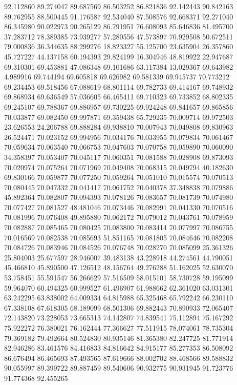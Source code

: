 92.112860
89.274047
89.687569
86.503252
86.821836
92.142443
90.842163
89.762955
88.500445
91.176587
92.534040
87.508576
92.668371
92.271040
86.345980
90.022973
90.265129
86.791951
76.608093
85.646836
81.495700
37.283712
78.389385
73.939277
57.280556
47.573897
70.929508
50.672511
79.000836
36.344635
88.299276
18.823327
55.125700
23.635904
26.357860
45.727227
44.137158
60.194393
29.824199
16.304946
48.819922
22.947687
69.310301
69.453881
47.086348
69.101686
63.117384
13.029367
69.643982
4.989916
69.744194
69.605818
69.626982
69.581339
69.945737
70.773212
69.234453
69.518456
67.088619
68.801114
69.782733
69.414167
69.748932
69.868934
69.636549
57.036605
66.465411
69.710323
69.733852
68.802335
69.245107
69.788367
69.886957
69.730225
69.924248
69.841657
69.865856
70.033877
69.082450
69.997871
69.359438
65.729235
70.009714
69.972503
23.626553
24.206788
69.888284
69.938810
70.007943
70.049808
69.830963
26.524471
70.023152
69.994956
70.034176
70.033955
70.079834
70.061467
70.059634
70.063540
70.066753
70.047603
70.070758
70.059890
70.060090
34.358397
70.053407
70.045117
70.060351
70.081588
70.028908
69.873093
70.020974
70.075264
70.071969
70.049408
70.068315
70.049794
40.182630
69.830166
70.059877
70.077250
70.059264
70.051010
70.015574
70.070513
70.080445
70.047332
70.041417
70.061752
70.040378
37.348838
70.079886
45.892364
70.082807
70.094393
70.078126
70.083657
70.081739
70.074980
70.077427
70.081527
48.481046
70.073446
70.082991
70.041330
70.070516
70.081996
70.076408
49.895880
70.062172
70.079012
70.043761
70.078959
70.082887
70.085465
70.080425
70.083800
70.083414
70.077997
70.086755
70.016569
70.082538
70.085693
51.851165
70.081805
70.084646
70.082208
70.084726
70.083946
70.084526
70.076748
70.028270
70.085099
25.361326
25.804003
25.677597
28.946007
39.483138
43.228918
44.274561
44.790051
45.466810
45.890500
47.126512
48.156764
49.276288
51.162025
52.630070
53.758451
55.591547
56.266629
57.516509
58.015101
58.730728
59.195099
59.964070
60.494325
60.999527
61.496907
61.988662
62.361020
63.031301
63.242295
63.838002
64.009334
64.815988
65.325468
65.792242
66.230110
67.338108
67.618305
68.189099
68.501306
69.882443
70.890933
72.065407
72.143820
73.228053
73.665313
74.142807
74.839541
75.112894
75.167292
75.922272
76.380021
76.162444
77.366627
77.511915
78.074061
78.735304
79.369182
79.492664
80.524830
80.935146
81.365380
82.247725
81.771914
82.946286
83.461576
84.416833
84.816642
84.915177
85.277353
86.508092
86.676494
86.465693
87.493565
87.619666
88.002702
88.468566
89.588832
90.055997
89.399722
89.887459
89.540606
90.932775
90.931945
91.723776
91.774368
92.455265
